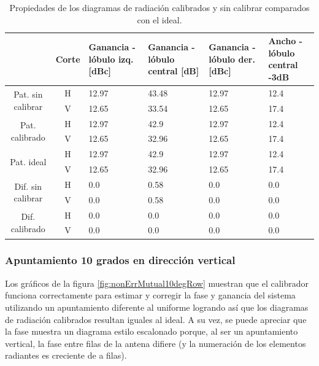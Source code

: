 \begin{table}[H]
  \footnotesize
  \centering
  \begin{tabular}{|c|c|p{2cm}|p{2.5cm}|p{2.5cm}|p{2.5cm}|}
    \cline{2-6}
    \multicolumn{1}{c|}{} & Corte & Ganancia - lóbulo izq. [dBc] & Ganancia - lóbulo central [dB] &
    Ganancia - lóbulo der. [dBc] & Ancho - lóbulo central -3dB \tabularnewline\hline
    \multirow{2}{2cm}{Pat. sin calibrar} & H & 12.97 & 43.48 & 12.97 & 12.4 \tabularnewline\cline{2-6}
     & V & 12.65 & 33.54 & 12.65 & 17.4 \tabularnewline\hline
    \multirow{2}{2cm}{Pat. calibrado} & H & 12.97 & 42.9 & 12.97 & 12.4 \tabularnewline\cline{2-6}
     & V & 12.65 & 32.96 & 12.65 & 17.4 \tabularnewline\hline
    \multirow{2}{2cm}{Pat. ideal} & H & 12.97 & 42.9 & 12.97 & 12.4 \tabularnewline\cline{2-6}
     & V & 12.65 & 32.96 & 12.65 & 17.4 \tabularnewline\hline
    \multirow{2}{2cm}{Dif. sin calibrar} & H & 0.0 & 0.58 & 0.0 & 0.0\tabularnewline\cline{2-6}
     & V & 0.0 & 0.58 & 0.0 & 0.0 \tabularnewline\hline
    \multirow{2}{2cm}{Dif. calibrado} & H & 0.0 & 0.0 & 0.0 & 0.0 \tabularnewline\cline{2-6}
     & V & 0.0 & 0.0 & 0.0 & 0.0 \tabularnewline\hline
  \end{tabular}
  \caption{Propiedades de los diagramas de radiación calibrados y sin calibrar comparados con el ideal.}
  \label{tab:nonErrMutual10degCol}
\end{table}


\subsubsection{Apuntamiento 10 grados en dirección vertical}

Los gráficos de la figura \ref{fig:nonErrMutual10degRow} muestran que el calibrador funciona correctamente para estimar y 
corregir la fase y ganancia del sistema utilizando un apuntamiento diferente al uniforme logrando así que los diagramas de 
radiación calibrados resultan iguales al ideal. A su vez, se puede apreciar que la fase muestra un diagrama estilo escalonado
porque, al ser un apuntamiento vertical, la fase entre filas de la antena difiere (y la numeración de los elementos radiantes 
es creciente de a filas).

